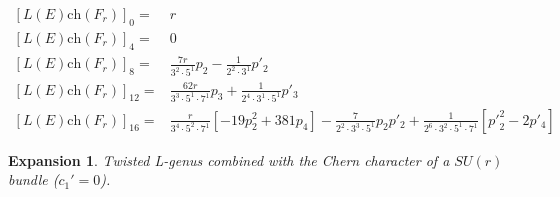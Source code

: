 \documentclass{amsart}
\theoremstyle{plain}
\newcommand{\ch}{\mathrm{ch}}
\numberwithin{equation}{section}
\newtheorem{ex}{Expansion}
\begin{document}
%
%
%
%
%
%
%
%


\begin{tcolorbox}[text width=16cm, height=3.6cm,
title=Twisted L-genus of  String bundles twisted by String bundles]
{\footnotesize
\begin{align*} 
 {[L(E)\ch(F_r)]}_0 =&r
\\
 {[L(E)\ch(F_r)]}_4 = &0 
\\
 {[L(E)\ch(F_r)]}_8 = &
 \tfrac{7r}{3^2\cdot 5^1} p_2
 -\tfrac{1}{2^2\cdot 3^1} p'_2
\\
 {[L(E)\ch(F_r)]}_{12}= &
 \tfrac{62r}{3^3\cdot 5^1\cdot 7^1} p_3
+\tfrac{1}{2^4\cdot 3^1\cdot 5^1} p'_3
\\
 {[L(E)\ch(F_r)]}_{16}= &
 \tfrac{r}{3^4\cdot 5^2\cdot 7^1}[-19 p_2^2+381 p_4]
-\tfrac{7}{2^2\cdot 3^3\cdot 5^1}p_2  p'_2
+\tfrac{1}{2^6\cdot 3^2\cdot 5^1\cdot 7^1}[{p'}_2^2 -2 p'_4]
\end{align*}
}
\end{tcolorbox}





\begin{ex}
Twisted L-genus combined with the Chern character of a $ SU(r) $ bundle ($c_1'=0$).
\end{ex} 

\end{document}
